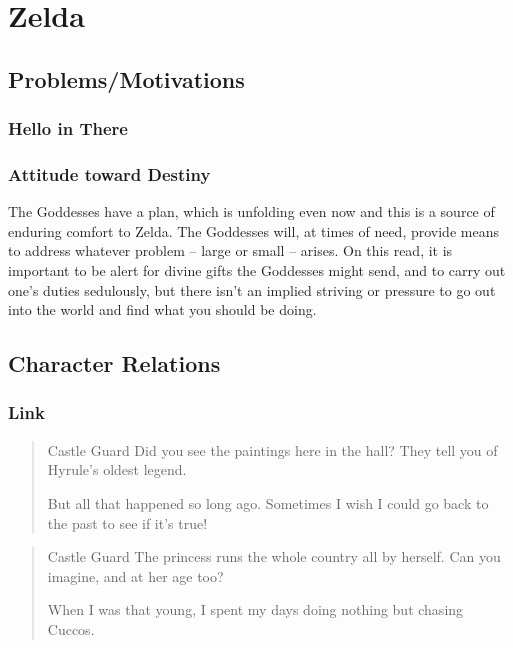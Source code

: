 \section{Zelda}
  \subsection{Problems/Motivations}
  \subsubsection{Hello in There}
  \subsubsection{Attitude toward Destiny}The Goddesses have a plan, which is unfolding even now and this is a source of enduring comfort to Zelda. The Goddesses will, at times of need, provide means to address whatever problem -- large or small -- arises. On this read, it is important to be alert for divine gifts the Goddesses might send, and to carry out one's duties sedulously, but there isn't an implied striving or pressure to go out into the world and find what you should be doing. 
  \subsection{Character Relations}
  \subsubsection{Link}
  \begin{quote}Castle Guard
  Did you see the paintings here in the hall? They tell you of Hyrule’s oldest legend.

  But all that happened so long ago. Sometimes I wish I could go back to the past to see if it’s true!\end{quote}

  \begin{quote}
  Castle Guard
  The princess runs the whole country all by herself. Can you imagine, and at her age too?

  When I was that young, I spent my days doing nothing but chasing Cuccos. 
  \end{quote}

